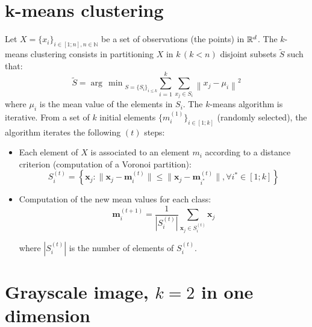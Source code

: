 \section{k-means clustering}
Let $X=\{x_i\}_{i\in [1;n], n\in \mathbb{N}}$ be a set of observations (the points) in $\mathbb{R}^d$. The $k$-means clustering consists in partitioning $X$ in $k\, (k<n)$ disjoint subsets $\tilde{S}$ such that:
\begin{equation}\tilde{S}=\displaystyle{\arg\,\min}_{S=\{S_i\}_{i\leq k}} \sum_{i=1}^{k} \sum_{x_j \in S_i} \left\|  x_j - \mu_i \right\|^2\end{equation}
where $\mu_i$ is the mean value of the elements in $S_i$. The $k$-means algorithm is iterative. From a set of $k$ initial elements $\{m_i^{(1)}\}_{i\in[1;k]}$ (randomly selected), the algorithm iterates the following $(t)$ steps:
\begin{itemize}
 \item Each element of $X$ is associated to an element $m_i$ according to a distance criterion (computation of a Voronoi partition):
\begin{equation}S_i^{(t)} = \left\{ \mathbf x_j : \big\| \mathbf x_j - \mathbf m^{(t)}_i \big\| \leq \big\| \mathbf x_j - \mathbf m^{(t)}_{i^*} \big\|, \forall i^*\in [1;k] \right\}\end{equation}

\item Computation of the new mean values for each class:\vspace*{-6pt}
\begin{equation} \mathbf m^{(t+1)}_i = \frac{1}{|S^{(t)}_i|} \sum_{\mathbf x_j \in S^{(t)}_i} \mathbf x_j\end{equation}
\vspace*{-\baselineskip}\vspace*{3pt}

\noindent where $|S^{(t)}_i|$ is the number of elements of $S^{(t)}_i$.
\end{itemize} 

\vspace*{-10pt}

\section{Grayscale image, $k=2$ in one dimension}

\vspace*{-6pt}

